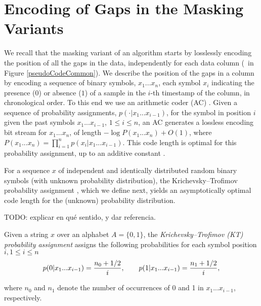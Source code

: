 
\clearpage
\section{Encoding of Gaps in the Masking Variants}
\label{algo:maskmodes}


\newcommand{\xOneN}{x_1...x_n}
\newcommand{\StringSeq}{x_1...x_{i-1}}
\newcommand{\xiiminus}{p(x_i|\StringSeq)}
\newcommand{\xiiminustwo}{p(\cdot|\StringSeq)}
\vspace{-5pt}
We recall that the masking variant of an algorithm starts by losslessly encoding the position of all the gaps in the data, independently for each data column (\Line \gapLine\ in Figure \ref{pseudoCodeCommon}). We describe the position of the gaps in a column by encoding a sequence of binary symbols, $\xOneN$, each symbol $x_i$ indicating the presence ($0$) or absence ($1$) of a sample in the $i$-th timestamp of the column, in chronological order. To this end we use an arithmetic coder (AC) \cite{ac2, Cover2005}. Given a sequence of probability assignments, $\xiiminustwo$, for the symbol in position $i$ given the past symbols $x_1...x_{i-1}$, $1\leq i \leq n$, an AC generates a lossless encoding bit stream for $\xOneN$, of length $-\log P(\xOneN) + O(1)$, where $P(\xOneN)=\prod_{i=1}^{n}\xiiminus$. This code length is optimal for this probability assignment, up to an additive constant \cite{arcoding}.


For a sequence $x$ of independent and identically distributed random binary symbols (with unknown probability distribution), the Krichevsky–Trofimov probability assignment \cite{ktestimator}, which we define next, yields an asymptotically optimal code length for the (unknown) probability distribution.


TODO: explicar en qué sentido, y dar referencia.


\begin{defcion}
\label{def:ktestimator}
Given a string $x$ over an alphabet $A = \{0, 1\}$, the \textit{Krichevsky–Trofimov (KT) probability assignment} assigns the following probabilities for each symbol position $i, 1\leq i \leq n$
\vspace{-2pt}
\begin{equation}
\label{eq:ktestimator}
p(0|\StringSeq) = \frac{n_0 + 1/2}{i}, \hspace{+20pt} p(1|\StringSeq) = \frac{n_1 + 1/2}{i},
\end{equation}
\end{defcion}
\vspace{-8pt}
where $n_0$ and $n_1$ denote the number of occurrences of 0 and 1 in $\StringSeq$, respectively.


